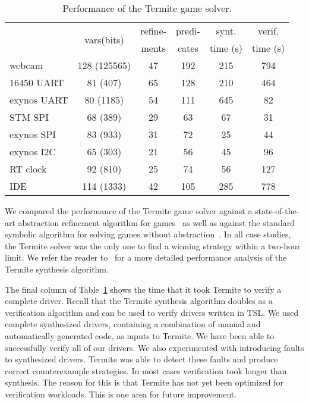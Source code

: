\documentclass{book}
\newcommand{\termite}{Termite\xspace}
\newcommand{\tsl}{TSL\xspace}
\theoremstyle{definition}
\begin{document}
\begin{table}
    \center
    \begin{tabular}{|l|ccccc|}
        \hline
                       & \multirow{2}{*}{vars(bits)} & refine- & predi- & synt.     & verif.   \\
                       &                             & ments   & cates  & time (s)  & time (s) \\
        \hline
        \hline
        webcam         & 128 (125565)                & 47      & 192    & 215       & 794 \\
        16450 UART     & 81  (407)                   & 65      & 128    & 210       & 464 \\
        exynos UART    & 80  (1185)                  & 54      & 111    & 645       & 82 \\
        STM SPI        & 68  (389)                   & 29      & 63     & 67        & 31 \\
        exynos SPI     & 83  (933)                   & 31      & 72     & 25        & 44 \\
        exynos I2C     & 65  (303)                   & 21      & 56     & 45        & 96 \\
        RT clock       & 92  (810)                   & 25      & 74     & 56        & 127 \\
        IDE            & 114 (1333)                  & 42      & 105    & 285       & 778 \\
        \hline
    \end{tabular}
    \caption{Performance of the \termite game solver.}
    \label{t:perf}
\end{table}

We compared the performance of the \termite game solver against a state-of-the-art abstraction refinement algorithm for games~\cite{Alfaro_Roy_07} as well as against the standard symbolic algorithm for solving games without abstraction~\cite{Piterman_PS_06}.  In all case studies, the \termite solver was the only one to find a winning strategy within a two-hour limit.  We refer the reader to~\cite{Walker_Ryzhyk_14} for a more detailed performance analysis of the \termite synthesis algorithm.

The final column of Table~\ref{t:perf} shows the time that it took \termite to verify a complete driver.  Recall that the \termite synthesis algorithm doubles as a verification algorithm and can be used to verify drivers written in \tsl.  We used complete synthesized drivers, containing a combination of manual and automatically generated code, as inputs to \termite.  We have been able to successfully verify all of our drivers.  We also experimented with introducing faults to synthesized drivers.  \termite was able to detect these faults and produce correct counterexample strategies.  In most cases verification took longer than synthesis.  The reason for this is that \termite has not yet been optimized for verification workloads.  This is one area for future improvement.
\end{document}
